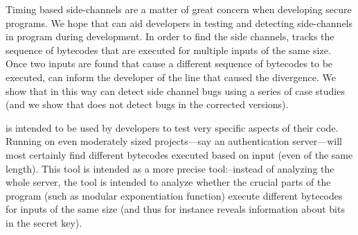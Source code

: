 Timing based side-channels are a matter of great concern when developing 
secure programs.
We hope that \jcupid can aid developers in testing and detecting side-channels
in program during development. 
In order to find the side channels, \jcupid  tracks the sequence of bytecodes
that are executed for multiple inputs of the same size.
Once two inputs are found that cause a different sequence of bytecodes to be
executed, \jcupid can inform the developer of the line that caused the
divergence.
We show that in this way \jcupid can detect side channel bugs using a series of
case studies (and we show that \jcupid does not detect bugs in the corrected
versions). 
 
\jcupid is intended to be used by developers to test very specific aspects of
their code.
Running \jcupid on even moderately sized  projects---say an authentication
server---will most certainly find different bytecodes executed based on input
(even of the same length).
This tool is intended as a more precise tool:--instead of analyzing the whole
server, the tool is intended to analyze whether the crucial parts of the program
(such as modular exponentiation function) execute different bytecodes for inputs
of the same size (and thus for instance reveals information about bits in the
secret key).  

